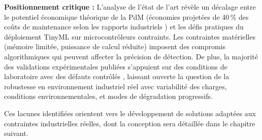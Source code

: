 \textbf{Positionnement critique :} L'analyse de l'état de l'art révèle un décalage entre le potentiel économique théorique de la PdM (économies projetées de 40\,\% des coûts de maintenance selon les rapports industriels \cite{siemens2024}) et les défis pratiques du déploiement TinyML sur microcontrôleurs contraints. Les contraintes matérielles (mémoire limitée, puissance de calcul réduite) imposent des compromis algorithmiques qui peuvent affecter la précision de détection. De plus, la majorité des validations expérimentales publiées s'appuient sur des conditions de laboratoire avec des défauts contrôlés \cite{antonini2023,arciniegas2025,langer2025}, laissant ouverte la question de la robustesse en environnement industriel réel avec variabilité des charges, conditions environnementales, et modes de dégradation progressifs.

Ces lacunes identifiées orientent vers le développement de solutions adaptées aux contraintes industrielles réelles, dont la conception sera détaillée dans le chapitre suivant.